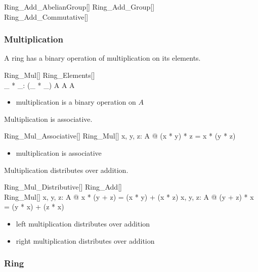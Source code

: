 \documentclass{amsart}
\begin{document}
\begin{schema}{Ring\_Add\_AbelianGroup}[\genT]
	Ring\_Add\_Group[\genT] \\
	Ring\_Add\_Commutative[\genT]
\end{schema}

\subsubsection{Multiplication}

A ring has a binary operation of multiplication on its elements.

\begin{schema}{Ring\_Mul}[\genT]
	Ring\_Elements[\genT] \\
	\_ * \_: \genT \cross \genT \pfun \genT
\where
	(\_ * \_) \in A \cross A \fun A
\end{schema}

\begin{itemize}
	\item multiplication is a binary operation on $A$
\end{itemize}

Multiplication is associative.

\begin{schema}{Ring\_Mul\_Associative}[\genT]
	Ring\_Mul[\genT]
\where
	\forall x, y, z: A @ (x * y) * z = x * (y * z)
\end{schema}

\begin{itemize}
	\item multiplication is associative
\end{itemize}

Multiplication distributes over addition.

\begin{schema}{Ring\_Mul\_Distributive}[\genT]
	Ring\_Add[\genT] \\
	Ring\_Mul[\genT]
\where
	\forall x, y, z: A @ x * (y + z) = (x * y) + (x * z)
\also
	\forall x, y, z: A @ (y + z) * x  = (y * x) + (z * x)
\end{schema}

\begin{itemize}
	\item left multiplication distributes over addition
	\item right multiplication distributes over addition
\end{itemize}

\subsubsection{Ring}
\end{document}
